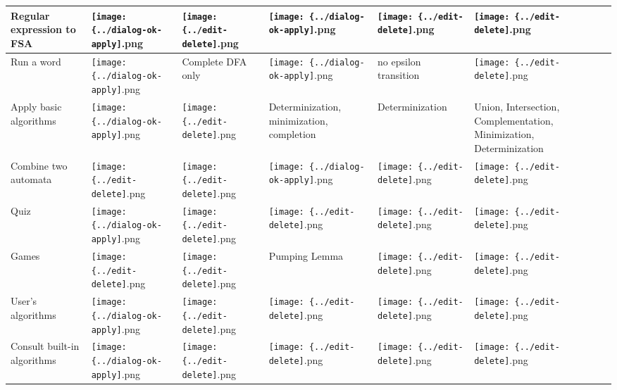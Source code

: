 \begin{tabularx}{\linewidth}{|*{6}{X|}}
\hline
 Regular expression to FSA    &  \texttt{[image: \{../dialog-ok-apply]}.png}            &  \texttt{[image: \{../edit-delete]}.png}     &  \texttt{[image: \{../dialog-ok-apply]}.png}     &  \texttt{[image: \{../edit-delete]}.png}                         &  \texttt{[image: \{../edit-delete]}.png}\tabularnewline
\hline
 Run a word                   &  \texttt{[image: \{../dialog-ok-apply]}.png}            &  Complete DFA only  &  \texttt{[image: \{../dialog-ok-apply]}.png}  &  no epsilon transition  &  \texttt{[image: \{../edit-delete]}.png}\tabularnewline
\hline
 Apply basic algorithms       &  \texttt{[image: \{../dialog-ok-apply]}.png}            &  \texttt{[image: \{../edit-delete]}.png}     &  Determinization, minimization, completion  &   Determinization  &  Union, Intersection, Complementation, Minimization, Determinization\tabularnewline
\hline
 Combine two automata         &  \texttt{[image: \{../edit-delete]}.png}             &  \texttt{[image: \{../edit-delete]}.png}     &  \texttt{[image: \{../dialog-ok-apply]}.png}     &  \texttt{[image: \{../edit-delete]}.png}                        &  \texttt{[image: \{../edit-delete]}.png}\tabularnewline
\hline
 Quiz                         &  \texttt{[image: \{../dialog-ok-apply]}.png}            &  \texttt{[image: \{../edit-delete]}.png}     &  \texttt{[image: \{../edit-delete]}.png}      &  \texttt{[image: \{../edit-delete]}.png}                        &  \texttt{[image: \{../edit-delete]}.png}\tabularnewline
\hline
 Games                        &  \texttt{[image: \{../edit-delete]}.png}             &  \texttt{[image: \{../edit-delete]}.png}     &  Pumping Lemma  &  \texttt{[image: \{../edit-delete]}.png}                 &  \texttt{[image: \{../edit-delete]}.png}\tabularnewline
\hline
 User's algorithms            &  \texttt{[image: \{../dialog-ok-apply]}.png}            &  \texttt{[image: \{../edit-delete]}.png}     &  \texttt{[image: \{../edit-delete]}.png}      &  \texttt{[image: \{../edit-delete]}.png}                        &  \texttt{[image: \{../edit-delete]}.png}\tabularnewline
\hline
 Consult built-in algorithms  &  \texttt{[image: \{../dialog-ok-apply]}.png}            &  \texttt{[image: \{../edit-delete]}.png}     &  \texttt{[image: \{../edit-delete]}.png}      &  \texttt{[image: \{../edit-delete]}.png}                        &  \texttt{[image: \{../edit-delete]}.png}\tabularnewline

\end{tabularx}
